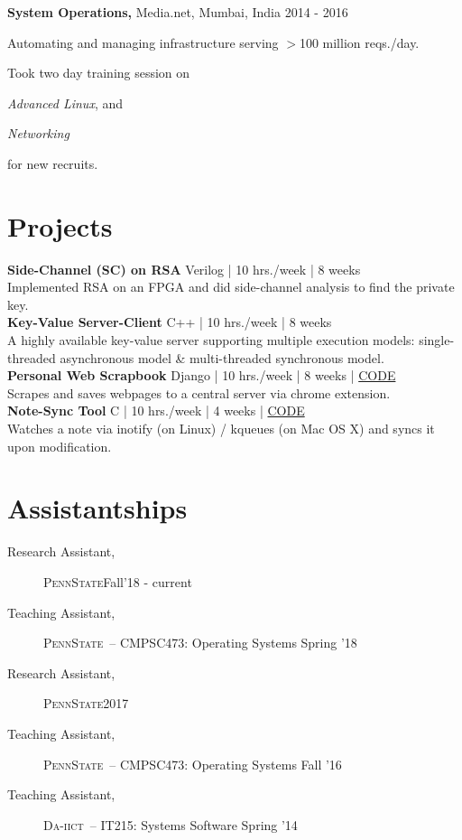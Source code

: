\documentclass[margin]{res}
\newcommand{\daiict}{\textsc{Da-iict}}
\newcommand{\psu}{\textsc{PennState}}
\begin{document}
\begin{resume}
{\bf System Operations,} Media.net, Mumbai, India
\hfill 2014 - 2016 %
\begin{itemizeexp}
    \item Automating and managing infrastructure serving $>$100 million reqs./day.
    \item Took two day training session on 
    \begin{enumerate*}[label=(\roman*)]
      \item \textit{Advanced Linux}, and
      \item \textit{Networking}
    \end{enumerate*}
     for new recruits.
\end{itemizeexp}

\section{Projects}
{\bfseries Side-Channel (SC) on RSA}\hfill
{\small Verilog | 10 hrs./week | 8 weeks}\\
Implemented RSA on an FPGA and did side-channel analysis to find the private key.\\[2ex]

{\bfseries Key-Value Server-Client}\hfill
{\small C++ | 10 hrs./week | 8 weeks}\\
A highly available key-value server supporting multiple execution models:
single-threaded asynchronous model \& multi-threaded synchronous model.\\[2ex]

{\bfseries Personal Web Scrapbook}\hfill
{\small Django | 10 hrs./week | 8 weeks | \href{https://bitbucket.org/mitthu/capsule/src/}{CODE}}\\
Scrapes and saves webpages to a central server via chrome extension.\\[2ex]

{\bfseries Note-Sync Tool}\hfill
{\small C | 10 hrs./week | 4 weeks | \href{https://github.com/mitthu/note-sync}{CODE}}\\
Watches a note via inotify (on Linux) / kqueues (on Mac OS X) and syncs it upon modification.

\section{Assistantships} 
\begin{description}
    \item[Research Assistant,] \psu \hfill Fall'18 - current
    \item[Teaching Assistant,] \psu\ -- CMPSC473: Operating Systems \hfill Spring '18 %
    \item[Research Assistant,] \psu \hfill 2017
    \item[Teaching Assistant,] \psu\ -- CMPSC473: Operating Systems \hfill Fall '16 %
    \item[Teaching Assistant,] \daiict\ -- IT215: Systems Software \hfill Spring '14 %
\end{description}


\end{resume}
\end{document}

